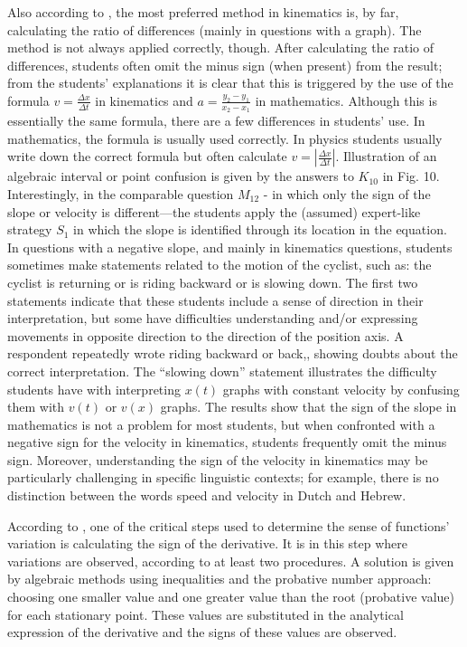 \documentclass[11pt]{book}
\begin{document}
Also according to \cite{ceuppens20199th}, the most preferred method in kinematics is, by far, calculating
the ratio of differences (mainly in questions with a graph). The method
is not always applied correctly, though. After calculating the ratio
of differences, students often omit the minus sign (when present)
from the result; from the students' explanations it is clear that this
is triggered by the use of the formula $v=\frac{\Delta x}{\Delta t}$
in kinematics and $a=\frac{y_{2}-y_{1}}{x_{2}-x_{1}}$ in mathematics.
Although this is essentially the same formula, there are a few differences
in students' use. In mathematics, the formula is usually used correctly.
In physics students usually write down the correct formula but often
calculate $v=\left|\frac{\Delta x}{\Delta t}\right|$. Illustration
of an algebraic interval or point confusion is given by the answers
to $K_{10}$ in Fig. 10. Interestingly, in the comparable question
$M_{12}$ - in which only the sign of the slope or velocity is different---the
students apply the (assumed) expert-like strategy $S_{1}$ in which
the slope is identified through its location in the equation. In questions
with a negative slope, and mainly in kinematics questions, students
sometimes make statements related to the motion of the cyclist, such
as: \textquotedbl the cyclist is returning\textquotedbl{} or \textquotedbl is
riding backward\textquotedbl{} or \textquotedbl is slowing down.\textquotedbl{}
The first two statements indicate that these students include a sense
of direction in their interpretation, but some have difficulties understanding
and/or expressing movements in opposite direction to the direction of the position
axis. A respondent repeatedly wrote \textquotedbl riding backward
or back,\textquotedbl{}, showing doubts about the correct
interpretation. The ``slowing down'' statement illustrates the difficulty
students have with interpreting $x\left(t\right)$ graphs with constant
velocity by confusing them with $v\left(t\right)$ or $v\left(x\right)$
graphs. The results show that the sign of the slope in mathematics
is not a problem for most students, but when confronted with a negative
sign for the velocity in kinematics, students frequently omit the minus
sign. Moreover, understanding the sign of the velocity in kinematics may be particularly challenging in specific linguistic contexts; for example, there is no distinction between the words speed and velocity in Dutch
and Hebrew.

According to
\cite{cabanas2019didactic}, one of the critical steps used to determine the sense of functions'
variation is calculating the sign of the derivative. It is in this step where variations are
observed, according to at least two procedures. A solution is given by
algebraic methods using inequalities and the \textquotedbl probative
number\textquotedbl{} approach: choosing one smaller value and one
greater value than the root (probative value) for each stationary
point. These values are substituted in the analytical expression of
the derivative and the signs of these values are observed.
\end{document}
